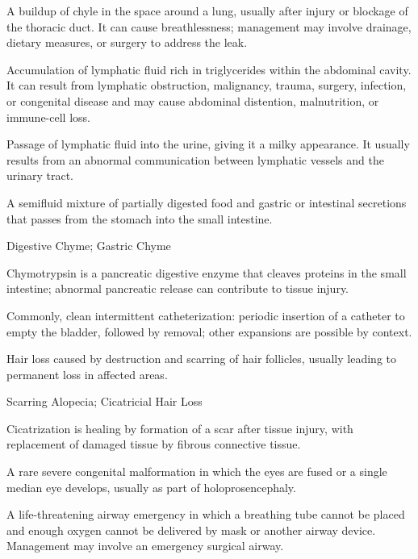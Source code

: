  A buildup of chyle in the space around a lung, usually after injury or blockage of the thoracic duct. It can cause breathlessness; management may involve drainage, dietary measures, or surgery to address the leak.

 Accumulation of lymphatic fluid rich in triglycerides within the abdominal cavity. It can result from lymphatic obstruction, malignancy, trauma, surgery, infection, or congenital disease and may cause abdominal distention, malnutrition, or immune-cell loss.

 Passage of lymphatic fluid into the urine, giving it a milky appearance. It usually
results from an abnormal communication between lymphatic vessels and the urinary tract.

 A semifluid mixture of partially digested food and gastric or intestinal secretions that passes from the stomach into the small intestine.

\synonyms
Digestive Chyme; Gastric Chyme

 Chymotrypsin is a pancreatic digestive enzyme that cleaves proteins in the small intestine; abnormal pancreatic release can contribute to tissue injury.

 Commonly, clean intermittent catheterization: periodic insertion of a catheter to empty the bladder, followed by removal; other expansions are possible by context.

 Hair loss caused by destruction and scarring of hair follicles, usually leading to permanent loss in affected areas.

\synonyms
Scarring Alopecia; Cicatricial Hair Loss

 Cicatrization is healing by formation of a scar after tissue injury, with replacement of damaged tissue by fibrous connective tissue.

 A rare severe congenital malformation in which the eyes are fused or a single median eye
develops, usually as part of holoprosencephaly.

 A life-threatening airway emergency in which a breathing tube cannot be placed and enough oxygen cannot be delivered by mask or another airway device. Management may involve an emergency surgical airway.



